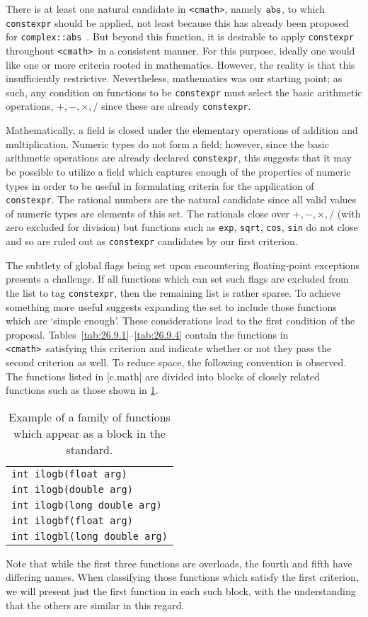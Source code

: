 \documentclass[prd,twocolumn,amsmath,amssymb,nofootinbib,eqsecnum]{revtex4-1}
\newcommand{\constexpr}{\code{constexpr}\xspace}
\newcommand{\code}[1]{{\tt #1}}
\newcommand{\header}[1]{{\tt <#1>}}
\newcommand{\cmath}{\header{cmath}}
\begin{document}
There is at least one natural candidate in \header{cmath}, namely $\code{abs}$,
to which \constexpr should be applied, not least because this has already been proposed
for \code{complex::abs}~\cite{AP-complex}. But beyond this function, it is desirable to
apply \constexpr throughout \cmath\ in a consistent manner. For this purpose, ideally one would
like one or more criteria rooted in mathematics. However, the reality is that
this insufficiently restrictive. Nevertheless, mathematics was our starting
point; as such, any condition on functions to be \constexpr must select the
basic arithmetic operations, $+,-,\times,/$ since these are already \constexpr.

Mathematically, a field is closed under the elementary operations of addition
and multiplication.
Numeric types do not form a field; however, since the basic arithmetic
operations are already declared \constexpr, this suggests that it may be
possible to utilize a field which captures enough of the properties of numeric
types in order to be useful in formulating criteria for the application of
\constexpr. The rational numbers are the natural candidate since all valid
values of numeric types are elements of this set. The rationals close over
$+,-,\times,/$ (with zero excluded for division)
but functions such as \code{exp}, \code{sqrt}, \code{cos},
\code{sin} do not close and so are ruled out as \constexpr candidates
by our first criterion.

The subtlety of global flags being set upon encountering floating-point
exceptions presents a challenge. If all functions which can set such flags are
excluded from the list to tag \constexpr, then the remaining list is rather
sparse. To achieve something more useful suggests expanding the set to include
those functions which are `simple enough'. These considerations lead to the
first condition of the proposal.
Tables~\ref{tab:26.9.1}--\ref{tab:26.9.4} contain the functions in \cmath\
satisfying this criterion and indicate whether or not they pass the second
criterion as well. To reduce space, the following convention is observed. The
functions listed in [c.math] are divided into blocks of closely related
functions such as those shown in \ref{tab:example}. 
\begin{table}
	\begin{tabular}{l}
		\code{int ilogb(float arg)}
	\\
		\code{int ilogb(double arg)}
	\\
		\code{int ilogb(long double arg)}
	\\
		\code{int ilogbf(float arg)}
	\\
		\code{int ilogbl(long double arg)}
	\end{tabular}
\caption{Example of a family of functions which appear as a block in the standard.}
\label{tab:example}
\end{table}
Note that while the first three functions are overloads, the fourth and fifth
have differing names.  When classifying those functions which satisfy the first
criterion, we will present just the first function in each such block, with the
understanding that the others are similar in this regard.
\end{document}
